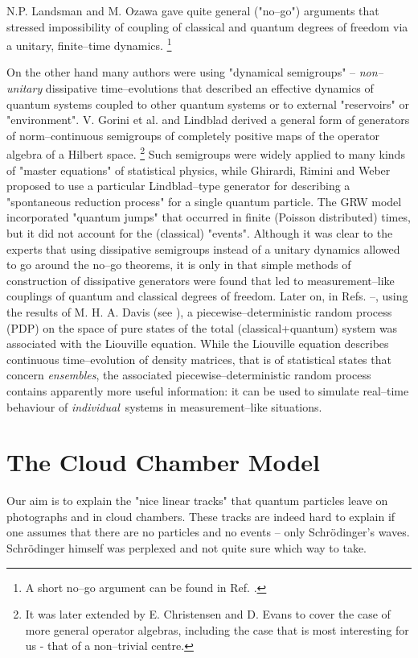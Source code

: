 \documentclass[12pt]{article}
\begin{document}
N.P. Landsman \cite{lan1} and M. Ozawa \cite{oza1} gave quite general
("no--go") arguments that stressed impossibility of coupling of classical
and quantum degrees of freedom via a unitary, finite--time dynamics.
\footnote{A short no--go argument can be found in Ref. \cite{jad1}.}

On the other hand many authors were using "dynamical semigroups" -- {\sl
non--unitary} dissipative time--evolutions that described an effective
dynamics of quantum systems coupled to other quantum systems or to external
"reservoirs" or "environment". V. Gorini et al. \cite{gor1} and Lindblad
\cite{lin1} derived a general form of generators of norm--continuous
semigroups of completely positive maps of the operator algebra of a Hilbert
space. \footnote{It was later extended by E. Christensen and D. Evans
\cite{chri1} to cover the case of more general operator algebras, including
the case that is most interesting for us - that of a non--trivial centre.}
Such semigroups were widely applied to many kinds of "master equations" of
statistical physics, while Ghirardi, Rimini and Weber \cite{ghi1} proposed
to use a particular Lindblad--type generator for describing a "spontaneous
reduction process" for a single quantum particle. The GRW model
incorporated "quantum jumps" that occurred in finite (Poisson distributed)
times, but it did not account for the (classical) "events". Although it was
clear to the experts that using dissipative semigroups instead of a unitary
dynamics allowed to go around the no--go theorems, it is only in
\cite{bla1} that simple methods of construction of dissipative generators
were found that led to measurement--like couplings of quantum and classical
degrees of freedom. Later on, in Refs. \cite{bla2}--\cite{jad1}, using the
results of M. H. A. Davis (see \cite{davmha1,davmha2}), a
piecewise--deterministic random process (PDP) on the space of pure states
of the total (classical+quantum) system was associated with the Liouville
equation. While the Liouville equation describes continuous time--evolution
of density matrices, that is of statistical states that concern {\sl
ensembles}, the associated piecewise--deterministic random process contains
apparently more useful information: it can be used to simulate real--time
behaviour of {\sl individual}\, systems in measurement--like situations.

\section{The Cloud Chamber Model}
Our aim is to explain the "nice linear tracks" that quantum particles leave
on photographs and in cloud chambers. These tracks are indeed hard to
explain if one assumes that there are no particles and no events -- only
Schr\"odinger's waves. Schr\"odinger himself was perplexed and not quite
sure which way to take.
\end{document}
